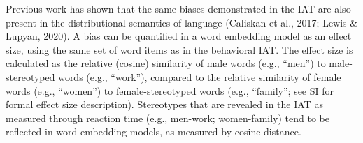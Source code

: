 \documentclass[
  english,
  ,man,floatsintext]{apa6}
\begin{document}
Previous work has shown that the same biases demonstrated in the IAT are also present in the distributional semantics of language (Caliskan et al., 2017; Lewis \& Lupyan, 2020). A bias can be quantified in a word embedding model as an effect size, using the same set of word items as in the behavioral IAT. The effect size is calculated as the relative (cosine) similarity of male words (e.g., \enquote{men}) to male-stereotyped words (e.g., \enquote{work}), compared to the relative similarity of female words (e.g., \enquote{women}) to female-stereotyped words (e.g., \enquote{family}; see SI for formal effect size description). Stereotypes that are revealed in the IAT as measured through reaction time (e.g., men-work; women-family) tend to be reflected in word embedding models, as measured by cosine distance.

\begingroup\fontsize{9}{11}\selectfont
\end{document}
